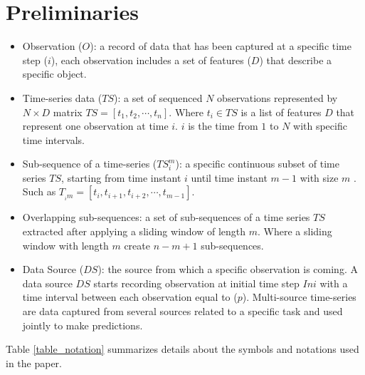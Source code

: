 \documentclass[conference]{IEEEtran}
\begin{document}
\section{Preliminaries}
\begin{itemize}
\item Observation ($O$): a record of data that has been captured at a specific time step ($i$), each observation includes a set of features ($D$) that describe a specific object.
\item Time-series data ($TS$):  a set of sequenced $N$ observations represented by $N \times D$ matrix  $TS = \left [t_{1},t_{2}, \cdots,t_{n} \right]$.  Where $t_{i} \in TS$ is a list of features $D$ that represent one observation at time $i$.  $i$ is the time from $1$ to $N$ with specific time intervals. 
\item Sub-sequence of a time-series ($TS_{i}^m$): a specific continuous subset of time series $TS$, starting from time instant $i$ until time instant $m-1$ with size $m$ . Such as $T_{_{i}m} = \left [t_{i},t_{i+1},t_{i+2},\cdots,t_{m-1} \right]$.
\item Overlapping sub-sequences:  a set of sub-sequences of a time series $TS$ extracted after applying a sliding window of length $m$. Where a sliding window with length $m$ create $n-m+1$ sub-sequences.
\item Data Source ($DS$):  the source from which a specific observation is coming. A data source $DS$ starts recording observation at initial time step $Ini$ with a time interval between each observation equal to ($p$). Multi-source time-series are data captured from several sources related to a specific task and used jointly to make predictions.  
\end{itemize}
Table \ref{table_notation} summarizes details about the symbols and notations used in the paper.
\end{document}
